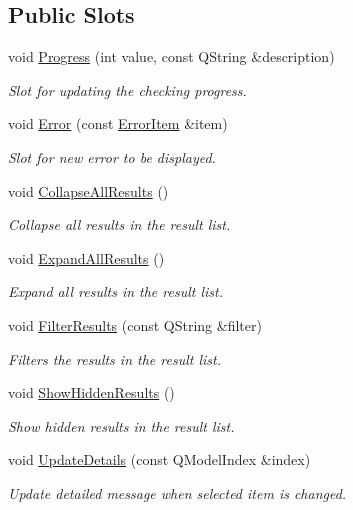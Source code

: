 \subsection*{Public Slots}
\begin{DoxyCompactItemize}
\item 
void \hyperlink{class_results_view_ad92c730f371f275de4bd36ecc12d6a03}{Progress} (int value, const Q\-String \&description)
\begin{DoxyCompactList}\small\item\em Slot for updating the checking progress. \end{DoxyCompactList}\item 
void \hyperlink{class_results_view_aa6a89e6137b3c3a2a1ed29bbf7fd960e}{Error} (const \hyperlink{class_error_item}{Error\-Item} \&item)
\begin{DoxyCompactList}\small\item\em Slot for new error to be displayed. \end{DoxyCompactList}\item 
void \hyperlink{class_results_view_a850bf055fef28532438263444e6da9d0}{Collapse\-All\-Results} ()
\begin{DoxyCompactList}\small\item\em Collapse all results in the result list. \end{DoxyCompactList}\item 
void \hyperlink{class_results_view_afe12d62e0af8147a0124bb412991065d}{Expand\-All\-Results} ()
\begin{DoxyCompactList}\small\item\em Expand all results in the result list. \end{DoxyCompactList}\item 
void \hyperlink{class_results_view_ae36303c44a0b2974f23cf50fa221468b}{Filter\-Results} (const Q\-String \&filter)
\begin{DoxyCompactList}\small\item\em Filters the results in the result list. \end{DoxyCompactList}\item 
void \hyperlink{class_results_view_aa324fbb7e39a5123469026aaf80ee76d}{Show\-Hidden\-Results} ()
\begin{DoxyCompactList}\small\item\em Show hidden results in the result list. \end{DoxyCompactList}\item 
void \hyperlink{class_results_view_a62e9f2ce85be2636154fcfcc805ba321}{Update\-Details} (const Q\-Model\-Index \&index)
\begin{DoxyCompactList}\small\item\em Update detailed message when selected item is changed. \end{DoxyCompactList}\end{DoxyCompactItemize}
